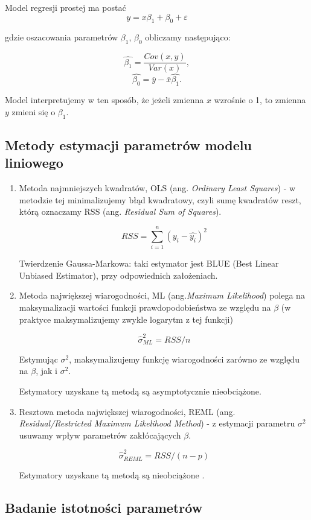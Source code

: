 \documentclass[12pt]{mwbk}
\theoremstyle{plain}
\theoremstyle{definition}
\theoremstyle{remark}
\begin{document}
Model regresji prostej ma postać 
$$y=x \beta_1+\beta_0 + \varepsilon$$

gdzie oszacowania parametrów $\beta_1$, $\beta_0$ obliczamy następująco:

$$\hat{\beta_1}=\frac{Cov(x,y)}{Var(x)},$$
$$\hat{\beta_0}=\overline{y}-\overline{x}\hat{\beta_1}.$$

Model interpretujemy w ten sposób, że jeżeli zmienna $x$ wzrośnie o 1, to zmienna $y$ zmieni się o $\beta_1$.
\subsection{Metody estymacji parametrów modelu liniowego}
\begin{enumerate}
	\item Metoda najmniejszych kwadratów, OLS (ang. \emph{Ordinary Least Squares}) - w metodzie tej minimalizujemy błąd kwadratowy, czyli sumę kwadratów reszt, którą oznaczamy RSS (ang. \emph{Residual Sum of Squares}).
	
	$$RSS= \sum_{i=1}^{n}(y_i-\hat{y_i})^2$$
	
	Twierdzenie Gaussa-Markowa: taki estymator jest BLUE (Best Linear Unbiased Estimator), przy odpowiednich założeniach.
	
	\item Metoda największej wiarogodności, ML (ang.\emph{Maximum Likelihood}) polega na maksymalizacji wartości funkcji prawdopodobieństwa ze względu na $\beta$ (w praktyce maksymalizujemy zwykle logarytm z tej funkcji)
	
	$$\hat{\sigma}^{2}_{ML}=RSS/n$$
	
	Estymując $\sigma^2$, maksymalizujemy funkcję wiarogodności zarówno ze względu na $\beta$, jak i $\sigma^2$.
	
	Estymatory uzyskane tą metodą są asymptotycznie nieobciążone.
	
	\item Resztowa metoda największej wiarogodności, REML (ang. \emph{Residual/Restricted Maximum Likelihood Method}) - z estymacji parametru $\sigma^2$ usuwamy wpływ parametrów zakłócających $\beta$.
	
	$$\hat{\sigma}^2_{REML}=RSS/(n-p)$$
	
	Estymatory uzyskane tą metodą są nieobciążone \cite{biecek}.
\end{enumerate}

\subsection{Badanie istotności parametrów}
\end{document}
